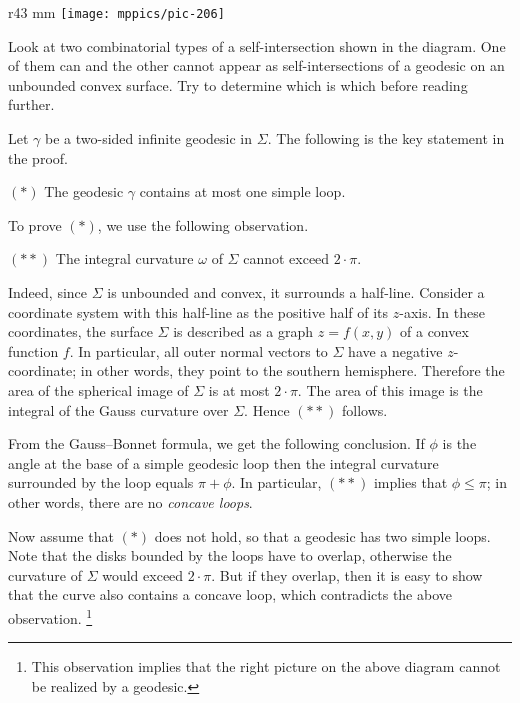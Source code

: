\begin{wrapfigure}{r}{43 mm}
\vskip-0mm
\centering
\texttt{[image: mppics/pic-206]}
\end{wrapfigure}

Look at two combinatorial types of a self-intersection shown in the diagram.
One of them can and the other cannot appear as self-intersections of a geodesic on an unbounded convex surface.
Try to determine which is which before reading further.

\medskip

Let $\gamma$ be a two-sided infinite geodesic in $\Sigma$.
The following is the key statement in the proof.

\begin{cl}{$({*})$}
The geodesic $\gamma$ contains at most one simple loop.
\end{cl}

To prove $({*})$, we use the following observation.

\begin{cl}{$({*}{*})$}
The integral curvature $\omega$ of $\Sigma$ cannot exceed $2\cdot\pi$.
\end{cl}

Indeed, since $\Sigma$ is unbounded and convex,
it surrounds a half-line.
Consider a coordinate system with this half-line as the positive half of its $z$-axis. 
In these coordinates, the surface $\Sigma$ is described as a graph $z=f(x,y)$ of a convex function $f$.
In particular, all outer normal vectors to $\Sigma$ have a negative $z$-coordinate;
in other words, they point to the southern hemisphere.
Therefore the area of the spherical image of $\Sigma$ is at most $2\cdot\pi$.
The area of this image is the integral of the Gauss curvature over $\Sigma$. 
Hence $({*}{*})$ follows.

From the Gauss--Bonnet formula, we get the following conclusion.
If $\phi$ is the angle at the base of a simple geodesic loop then the integral curvature surrounded by the loop equals $\pi+\phi$. 
In particular, $({*}{*})$ implies that $\phi\le\pi$; in other words, there are no \emph{concave loops}.

Now assume that $({*})$ does not hold, so that a geodesic has two simple loops.
Note that the disks bounded by the loops  have to overlap,
otherwise the curvature of $\Sigma$ would exceed $2\cdot\pi$.
But if they overlap, then it is easy to show that the curve also contains a concave loop, 
which contradicts the above observation.%
\footnote{This observation implies that the right picture on the above diagram cannot be realized by a geodesic.}

